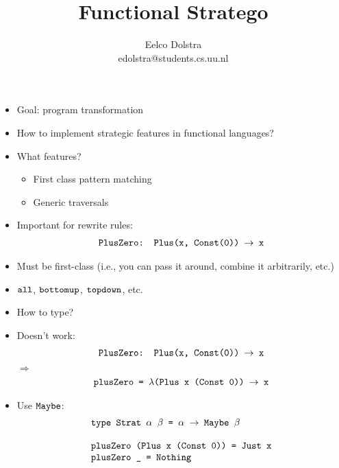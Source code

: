\documentclass[leqno, fleqn]{foils}
\title{Functional Stratego}
\author{Eelco Dolstra\\edolstra@students.cs.uu.nl}
\newcommand{\ve}[1]{\ensuremath{\text{\tt #1}}}
\newcommand{\ra}{\ensuremath{\rightarrow} }
\newcommand{\Ra}{\ensuremath{\Rightarrow} }
\begin{document}
\maketitle



\begin{itemize}
\item Goal: program transformation
\item How to implement strategic features in functional languages?
\item What features?
  \begin{itemize}
  \item First class pattern matching
  \item Generic traversals
  \end{itemize}
\end{itemize}



\begin{itemize}
\item Important for rewrite rules:
  \[
  \begin{array}{l}
    \ve{PlusZero: Plus(x, Const(0)) \ra x} \\
  \end{array}
  \]
\item Must be first-class (i.e., you can pass it around, combine it
  arbitrarily, etc.)
\end{itemize}



\begin{itemize}
\item \ve{all}, \ve{bottomup}, \ve{topdown}, etc.
\item How to type?
\end{itemize}



\begin{itemize}
\item Doesn't work:
\[
\begin{array}{l}
\ve{PlusZero: Plus(x, Const(0)) \ra x}\\
\end{array}
\]
$\Ra$
\[
\begin{array}{l}
\ve{plusZero = $\lambda$(Plus x (Const 0)) \ra x}\\
\end{array}
\]
\item Use \ve{Maybe}:
\[
\begin{array}{l}
\ve{type Strat $\alpha$ $\beta$ = $\alpha$ \ra Maybe $\beta$} \\
\\
\ve{plusZero (Plus x (Const 0)) = Just x} \\
\ve{plusZero \_ = Nothing} \\
\end{array}
\]
\end{itemize}
\end{document}
